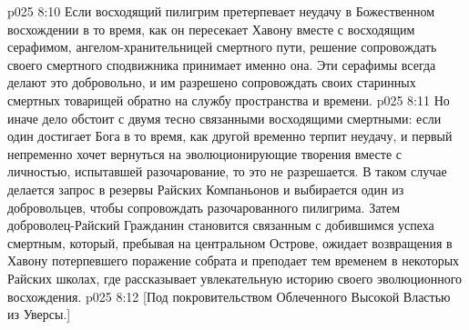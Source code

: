 \vs p025 8:10 Если восходящий пилигрим претерпевает неудачу в Божественном восхождении в то время, как он пересекает Хавону вместе с восходящим серафимом, ангелом\hyp{}хранительницей смертного пути, решение сопровождать своего смертного сподвижника принимает именно она. Эти серафимы всегда делают это добровольно, и им разрешено сопровождать своих старинных смертных товарищей обратно на службу пространства и времени.
\vs p025 8:11 Но иначе дело обстоит с двумя тесно связанными восходящими смертными: если один достигает Бога в то время, как другой временно терпит неудачу, и первый непременно хочет вернуться на эволюционирующие творения вместе с личностью, испытавшей разочарование, то это не разрешается. В таком случае делается запрос в резервы Райских Компаньонов и выбирается один из добровольцев, чтобы сопровождать разочарованного пилигрима. Затем доброволец\hyp{}Райский Гражданин становится связанным с добившимся успеха смертным, который, пребывая на центральном Острове, ожидает возвращения в Хавону потерпевшего поражение собрата и преподает тем временем в некоторых Райских школах, где рассказывает увлекательную историю своего эволюционного восхождения.
\vsetoff
\vs p025 8:12 [Под покровительством Облеченного Высокой Властью из Уверсы.]

